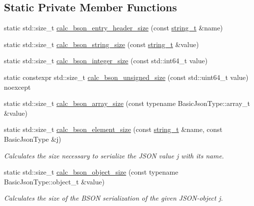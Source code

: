 \subsection*{Static Private Member Functions}
\begin{DoxyCompactItemize}
\item 
static std\+::size\+\_\+t \hyperlink{classnlohmann_1_1detail_1_1binary__writer_a5bae2f1db2c511b869dffaddf15a1653}{calc\+\_\+bson\+\_\+entry\+\_\+header\+\_\+size} (const \hyperlink{classnlohmann_1_1detail_1_1binary__writer_a29f2ae7a5c4a8c1dae47b3b2310de8a8}{string\+\_\+t} \&name)
\item 
static std\+::size\+\_\+t \hyperlink{classnlohmann_1_1detail_1_1binary__writer_aea44fd97a5cb9b4f175e66e3e4fdf158}{calc\+\_\+bson\+\_\+string\+\_\+size} (const \hyperlink{classnlohmann_1_1detail_1_1binary__writer_a29f2ae7a5c4a8c1dae47b3b2310de8a8}{string\+\_\+t} \&value)
\item 
static std\+::size\+\_\+t \hyperlink{classnlohmann_1_1detail_1_1binary__writer_aeab70c895931b96ea598306b37eca271}{calc\+\_\+bson\+\_\+integer\+\_\+size} (const std\+::int64\+\_\+t value)
\item 
static constexpr std\+::size\+\_\+t \hyperlink{classnlohmann_1_1detail_1_1binary__writer_aa1d6bb9f3af16f07ce2440c354b5787b}{calc\+\_\+bson\+\_\+unsigned\+\_\+size} (const std\+::uint64\+\_\+t value) noexcept
\item 
static std\+::size\+\_\+t \hyperlink{classnlohmann_1_1detail_1_1binary__writer_af08f9302a02516ff8cf358a99aaa1ddf}{calc\+\_\+bson\+\_\+array\+\_\+size} (const typename Basic\+Json\+Type\+::array\+\_\+t \&value)
\item 
static std\+::size\+\_\+t \hyperlink{classnlohmann_1_1detail_1_1binary__writer_a1e4372c5984184eb5bcc09af1fcc2ee0}{calc\+\_\+bson\+\_\+element\+\_\+size} (const \hyperlink{classnlohmann_1_1detail_1_1binary__writer_a29f2ae7a5c4a8c1dae47b3b2310de8a8}{string\+\_\+t} \&name, const Basic\+Json\+Type \&j)
\begin{DoxyCompactList}\small\item\em Calculates the size necessary to serialize the J\+S\+ON value {\itshape j} with its {\itshape name}. \end{DoxyCompactList}\item 
static std\+::size\+\_\+t \hyperlink{classnlohmann_1_1detail_1_1binary__writer_acc6f1cc1fd370ee84ebc8cf7b8712840}{calc\+\_\+bson\+\_\+object\+\_\+size} (const typename Basic\+Json\+Type\+::object\+\_\+t \&value)
\begin{DoxyCompactList}\small\item\em Calculates the size of the B\+S\+ON serialization of the given J\+S\+O\+N-\/object {\itshape j}. \end{DoxyCompactList}\item 

\end{DoxyCompactItemize}
